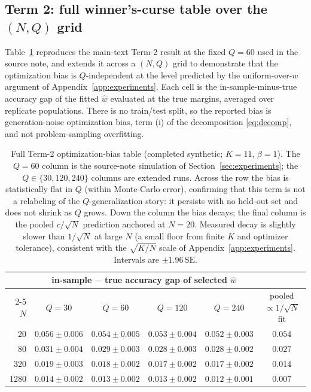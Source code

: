 \documentclass{article} %
\providecommand{\what}{\widehat{w}}
\begin{document}
\subsection{Term 2: full winner's-curse table over the \texorpdfstring{$(N,Q)$}{(N,Q)} grid}
\label{app:tab-channel2}

Table~\ref{tab:full-channel2} reproduces the main-text Term-2 result at the
fixed $Q=60$ used in the source note, and extends it across a $(N,Q)$ grid to
demonstrate that the optimization bias is $Q$-independent at the level predicted
by the uniform-over-$w$ argument of Appendix~\ref{app:experiments}. Each cell is
the in-sample-minus-true accuracy gap of the fitted $\what$ evaluated at the true
margins, averaged over replicate populations. There is no train/test split, so
the reported bias is generation-noise optimization bias, term (i) of the
decomposition \eqref{eq:decomp}, and not problem-sampling overfitting.

\begin{table}[t]
\centering
\small
\begin{tabular}{rccccc}
\toprule
& \multicolumn{4}{c}{in-sample $-$ true accuracy gap of selected $\what$} \\
\cmidrule(lr){2-5}
$N$ & $Q=30$ & $Q=60$ & $Q=120$ & $Q=240$ & pooled $\propto 1/\sqrt N$ fit \\
\midrule
20   & $0.056 \pm 0.006$ & $0.054 \pm 0.005$ & $0.053 \pm 0.004$ & $0.052 \pm 0.003$ & $0.054$ \\
80   & $0.031 \pm 0.004$ & $0.029 \pm 0.003$ & $0.028 \pm 0.003$ & $0.028 \pm 0.002$ & $0.027$ \\
320  & $0.019 \pm 0.003$ & $0.018 \pm 0.002$ & $0.017 \pm 0.002$ & $0.017 \pm 0.002$ & $0.014$ \\
1280 & $0.014 \pm 0.002$ & $0.013 \pm 0.002$ & $0.013 \pm 0.002$ & $0.012 \pm 0.001$ & $0.007$ \\
\bottomrule
\end{tabular}
\caption{Full Term-2 optimization-bias table (completed synthetic;
$K=11$, $\beta=1$). The $Q=60$ column is the source-note simulation of
Section~\ref{sec:experiments}; the $Q\in\{30,120,240\}$ columns are extended runs.
Across the row the bias is statistically flat in $Q$ (within Monte-Carlo error),
confirming that this term is not a relabeling of the $Q$-generalization
story: it persists with no held-out set and does not shrink as $Q$ grows. Down
the column the bias decays; the final column is the pooled $c/\sqrt N$ prediction
anchored at $N=20$. Measured decay is slightly slower than $1/\sqrt N$ at large
$N$ (a small floor from finite $K$ and optimizer tolerance), consistent with the
$\sqrt{K/N}$ scale of Appendix~\ref{app:experiments}. Intervals are
$\pm 1.96\,\mathrm{SE}$.}
\label{tab:full-channel2}
\end{table}
\end{document}
